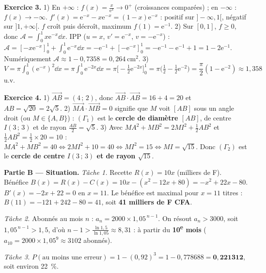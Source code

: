 \noindent\textbf{Exercice 3.}
1) En $+\infty$ : $f(x)=\frac{x}{\mathrm e^{x}}\to0^+$ (croissances comparées) ; en
$-\infty$ : $f(x)\to-\infty$. $f'(x)=\mathrm e^{-x}-x\mathrm e^{-x}=(1-x)\mathrm e^{-x}$ :
positif sur $]-\infty,1[$, négatif sur $]1,+\infty[$. $f$ croît puis décroît, maximum
$f(1)=\mathrm e^{-1}$.
2) Sur $[0,1]$, $f\ge0$, donc $\mathcal A=\int_0^1 x\mathrm e^{-x}\dd x$. IPP ($u=x$,
$v'=\mathrm e^{-x}$, $v=-\mathrm e^{-x}$) :
$\mathcal A=[-x\mathrm e^{-x}]_0^1+\int_0^1\mathrm e^{-x}\dd x=-\mathrm e^{-1}+[-\mathrm e^{-x}]_0^1=-\mathrm e^{-1}-\mathrm e^{-1}+1=1-2\mathrm e^{-1}$.
Numériquement $\mathcal A\approx1-0{,}7358=0{,}264\ \si{\centi\metre\squared}$.
3) $V=\pi\int_0^1(\mathrm e^{-x})^2\dd x=\pi\int_0^1\mathrm e^{-2x}\dd x=\pi\Big[-\tfrac12\mathrm e^{-2x}\Big]_0^1
=\pi\Big(\tfrac12-\tfrac12\mathrm e^{-2}\Big)=\dfrac{\pi}{2}(1-\mathrm e^{-2})\approx1{,}358$ u.v.

\noindent\textbf{Exercice 4.}
1) $\overrightarrow{AB}=(4\,;\,2)$, donc $\overrightarrow{AB}\cdot\overrightarrow{AB}=16+4=20$
et $AB=\sqrt{20}=2\sqrt5$.
2) $\overrightarrow{MA}\cdot\overrightarrow{MB}=0$ signifie que $M$ voit $[AB]$ sous un
angle droit (ou $M\in\{A,B\}$) : $(\Gamma_1)$ est le \textbf{cercle de diamètre $[AB]$},
de centre $I(3\,;\,3)$ et de rayon $\frac{AB}{2}=\sqrt5$.
3) Avec $MA^2+MB^2=2MI^2+\frac12AB^2$ et $\frac12AB^2=\frac12\times20=10$ :
$MA^2+MB^2=40\iff2MI^2+10=40\iff MI^2=15\iff MI=\sqrt{15}$. Donc $(\Gamma_2)$ est le
\textbf{cercle de centre $I(3\,;\,3)$ et de rayon $\sqrt{15}$}.

\smallskip
\noindent\textbf{Partie B — Situation.}
\emph{Tâche 1.} Recette $R(x)=10x$ (milliers de F). Bénéfice
$B(x)=R(x)-C(x)=10x-(x^2-12x+80)=-x^2+22x-80$. $B'(x)=-2x+22=0$ en $x=11$. Le bénéfice
est maximal pour $x=11$ titres : $B(11)=-121+242-80=41$, soit \textbf{41 milliers de F CFA}.

\emph{Tâche 2.} Abonnés au mois $n$ : $a_n=2000\times1{,}05^{\,n-1}$. On résout $a_n>3000$,
soit $1{,}05^{\,n-1}>1{,}5$, d'où $n-1>\frac{\ln1{,}5}{\ln1{,}05}\approx8{,}31$ : à partir
du \textbf{10\textsuperscript{e} mois} ($a_{10}=2000\times1{,}05^9\approx3102$ abonnés).

\emph{Tâche 3.} $P(\text{au moins une erreur})=1-(0{,}92)^3=1-0{,}778688=\mathbf{0{,}221312}$,
soit environ \SI{22}{\percent}.
